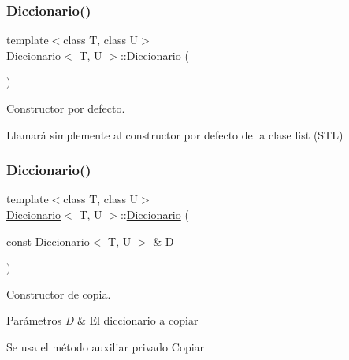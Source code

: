 \subsubsection{\texorpdfstring{Diccionario()}{Diccionario()}\hspace{0.1cm}{\footnotesize\ttfamily [1/2]}}
{\footnotesize\ttfamily template$<$class T, class U$>$ \\
\hyperlink{classDiccionario}{Diccionario}$<$ T, U $>$\+::\hyperlink{classDiccionario}{Diccionario} (\begin{DoxyParamCaption}{ }\end{DoxyParamCaption})\hspace{0.3cm}{\ttfamily [inline]}}



Constructor por defecto. 

Llamará simplemente al constructor por defecto de la clase list (S\+TL) \mbox{\label{classDiccionario_ad8917f4e401b473139403dc5964e8307}} 
\subsubsection{\texorpdfstring{Diccionario()}{Diccionario()}\hspace{0.1cm}{\footnotesize\ttfamily [2/2]}}
{\footnotesize\ttfamily template$<$class T, class U$>$ \\
\hyperlink{classDiccionario}{Diccionario}$<$ T, U $>$\+::\hyperlink{classDiccionario}{Diccionario} (\begin{DoxyParamCaption}\item[{const \hyperlink{classDiccionario}{Diccionario}$<$ T, U $>$ \&}]{D }\end{DoxyParamCaption})\hspace{0.3cm}{\ttfamily [inline]}}



Constructor de copia. 


\begin{DoxyParams}{Parámetros}
{\em D} & El diccionario a copiar\\
\hline
\end{DoxyParams}
Se usa el método auxiliar privado Copiar \mbox{\label{classDiccionario_a006b21559ae7e1b449c785fc47dfb04d}} 
